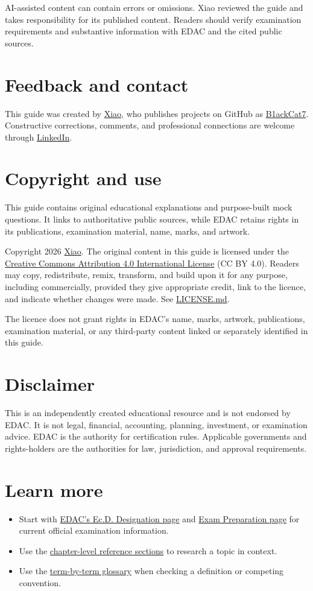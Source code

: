 \documentclass[11pt,letterpaper,oneside,openany]{book}
\newif\ifsectionhasicon
\newcommand{\currentsectionicon}{}
\newcommand{\marginsection}[2]{%
  \begingroup
  \sectionhasicontrue
  \def\currentsectionicon{#1}%
  \section[#2]{#2}%
  \endgroup
}
\begin{document}
AI-assisted content can contain errors or omissions. Xiao reviewed the guide and takes responsibility for its published content. Readers should verify examination requirements and substantive information with EDAC and the cited public sources.


\marginsection{user-round}{Feedback and contact}
This guide was created by \href{https://www.linkedin.com/in/xxiao27/}{Xiao}, who publishes projects on GitHub as \href{https://github.com/B1ackCat7}{B1ackCat7}. Constructive corrections, comments, and professional connections are welcome through \href{https://www.linkedin.com/in/xxiao27/}{LinkedIn}.


\marginsection{badge-check}{Copyright and use}
This guide contains original educational explanations and purpose-built mock questions. It links to authoritative public sources, while EDAC retains rights in its publications, examination material, name, marks, and artwork.


Copyright \textcopyright{} 2026 \href{https://www.linkedin.com/in/xxiao27/}{Xiao}. The original content in this guide is licensed under the \href{https://creativecommons.org/licenses/by/4.0/}{Creative Commons Attribution 4.0 International License} (CC BY 4.0). Readers may copy, redistribute, remix, transform, and build upon it for any purpose, including commercially, provided they give appropriate credit, link to the licence, and indicate whether changes were made. See \hyperref[chap:license]{LICENSE.md}.


The licence does not grant rights in EDAC's name, marks, artwork, publications, examination material, or any third-party content linked or separately identified in this guide.


\marginsection{shield-alert}{Disclaimer}
This is an independently created educational resource and is not endorsed by EDAC. It is not legal, financial, accounting, planning, investment, or examination advice. EDAC is the authority for certification rules. Applicable governments and rights-holders are the authorities for law, jurisdiction, and approval requirements.


\marginsection{external-link}{Learn more}
\begin{itemize}
\item Start with \href{https://edac.ca/professional-development/ecd-designation/}{EDAC's Ec.D. Designation page} and \href{https://exam.edac.ca/exam-prep/}{Exam Preparation page} for current official examination information.
\item Use the \hyperref[chap:about]{chapter-level reference sections} to research a topic in context.
\item Use the \hyperref[chap:glossary]{term-by-term glossary} when checking a definition or competing convention.
\end{itemize}
\end{document}
